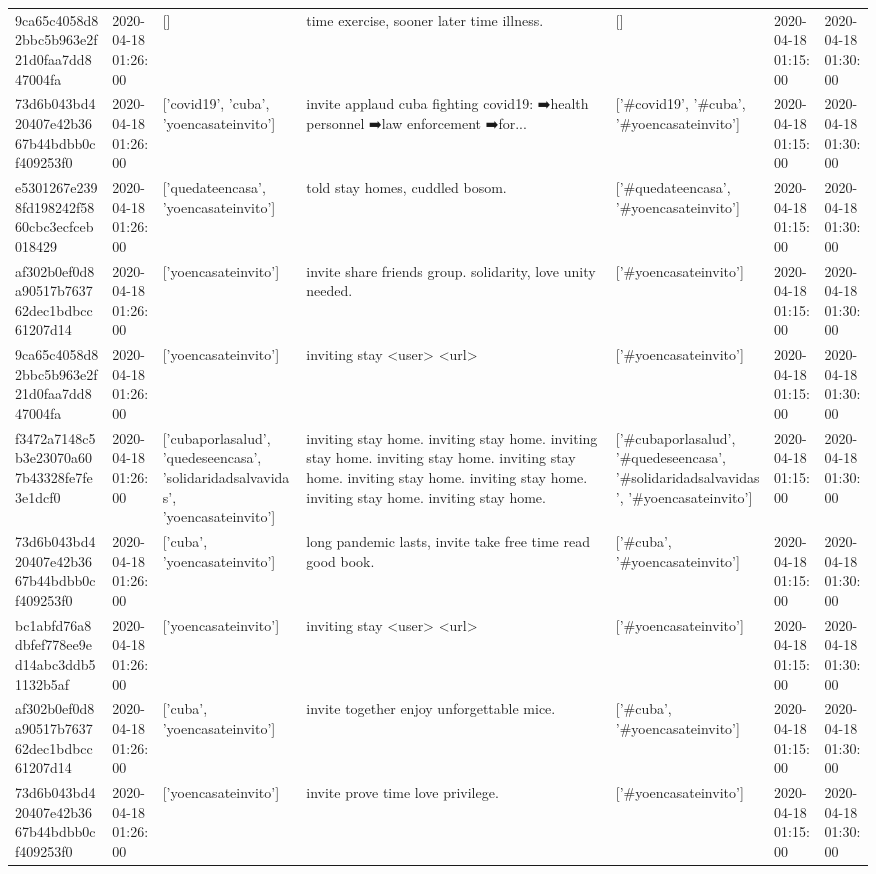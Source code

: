 \begin{tabular}{lllllll}
9ca65c4058d82bbc5b963e2f21d0faa7dd847004fa & 2020-04-18 01:26:00 & [] & time exercise, sooner later time illness. & [] & 2020-04-18 01:15:00 & 2020-04-18 01:30:00 \\
73d6b043bd420407e42b3667b44bdbb0cf409253f0 & 2020-04-18 01:26:00 & ['covid19', 'cuba', 'yoencasateinvito'] & invite applaud cuba fighting covid19: ➡️health personnel ➡️law enforcement ➡️for... & ['#covid19', '#cuba', '#yoencasateinvito'] & 2020-04-18 01:15:00 & 2020-04-18 01:30:00 \\
e5301267e2398fd198242f5860cbc3ecfceb018429 & 2020-04-18 01:26:00 & ['quedateencasa', 'yoencasateinvito'] & told stay homes, cuddled bosom. & ['#quedateencasa', '#yoencasateinvito'] & 2020-04-18 01:15:00 & 2020-04-18 01:30:00 \\
af302b0ef0d8a90517b763762dec1bdbcc61207d14 & 2020-04-18 01:26:00 & ['yoencasateinvito'] & invite share friends group. solidarity, love unity needed. & ['#yoencasateinvito'] & 2020-04-18 01:15:00 & 2020-04-18 01:30:00 \\
9ca65c4058d82bbc5b963e2f21d0faa7dd847004fa & 2020-04-18 01:26:00 & ['yoencasateinvito'] & inviting stay <user> <url> & ['#yoencasateinvito'] & 2020-04-18 01:15:00 & 2020-04-18 01:30:00 \\
f3472a7148c5b3e23070a607b43328fe7fe3e1dcf0 & 2020-04-18 01:26:00 & ['cubaporlasalud', 'quedeseencasa', 'solidaridadsalvavidas', 'yoencasateinvito'] & inviting stay home. inviting stay home. inviting stay home. inviting stay home. inviting stay home. inviting stay home. inviting stay home. inviting stay home. inviting stay home. & ['#cubaporlasalud', '#quedeseencasa', '#solidaridadsalvavidas', '#yoencasateinvito'] & 2020-04-18 01:15:00 & 2020-04-18 01:30:00 \\
73d6b043bd420407e42b3667b44bdbb0cf409253f0 & 2020-04-18 01:26:00 & ['cuba', 'yoencasateinvito'] & long pandemic lasts, invite take free time read good book. & ['#cuba', '#yoencasateinvito'] & 2020-04-18 01:15:00 & 2020-04-18 01:30:00 \\
bc1abfd76a8dbfef778ee9ed14abc3ddb51132b5af & 2020-04-18 01:26:00 & ['yoencasateinvito'] & inviting stay <user> <url> & ['#yoencasateinvito'] & 2020-04-18 01:15:00 & 2020-04-18 01:30:00 \\
af302b0ef0d8a90517b763762dec1bdbcc61207d14 & 2020-04-18 01:26:00 & ['cuba', 'yoencasateinvito'] & invite together enjoy unforgettable mice. & ['#cuba', '#yoencasateinvito'] & 2020-04-18 01:15:00 & 2020-04-18 01:30:00 \\
73d6b043bd420407e42b3667b44bdbb0cf409253f0 & 2020-04-18 01:26:00 & ['yoencasateinvito'] & invite prove time love privilege. & ['#yoencasateinvito'] & 2020-04-18 01:15:00 & 2020-04-18 01:30:00 \\

\end{tabular}
